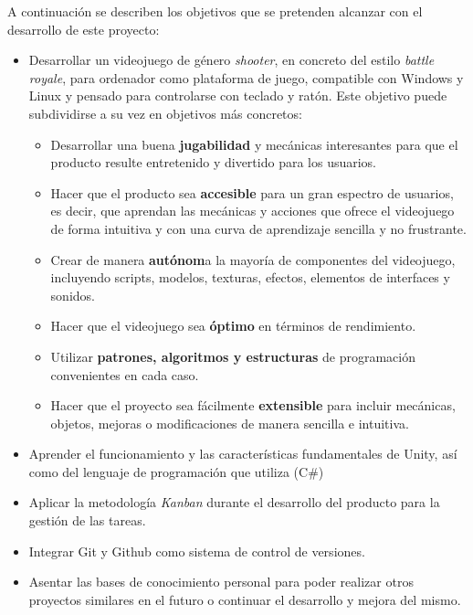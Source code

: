 
A continuación se describen los objetivos que se pretenden alcanzar con el desarrollo de este proyecto:
\begin{itemize}
\tightlist
	\item Desarrollar un videojuego de género \textit{shooter}, en concreto del estilo \textit{battle royale}, para ordenador como plataforma de juego, compatible con Windows y Linux y pensado para controlarse con teclado y ratón. Este objetivo puede subdividirse a su vez en objetivos más concretos:
    	\begin{itemize}
    	\tightlist
    	\item Desarrollar una buena \textbf{jugabilidad} y mecánicas interesantes para que el producto resulte entretenido y divertido para los usuarios.
    	\item Hacer que el producto sea \textbf{accesible} para un gran espectro de usuarios, es decir, que aprendan las mecánicas y acciones que ofrece el videojuego de forma intuitiva y con una curva de aprendizaje sencilla y no frustrante.
    	\item Crear de manera \textbf{autónom}a la mayoría de componentes del videojuego, incluyendo scripts, modelos, texturas, efectos, elementos de interfaces y sonidos.
    	\item Hacer que el videojuego sea \textbf{óptimo} en términos de rendimiento.
    	\item Utilizar \textbf{patrones, algoritmos y estructuras} de programación convenientes en cada caso.
    	\item Hacer que el proyecto sea fácilmente \textbf{extensible} para incluir mecánicas, objetos, mejoras o modificaciones de manera sencilla e intuitiva.
    	\end{itemize}
	\item Aprender el funcionamiento y las características fundamentales de Unity, así como del lenguaje de programación que utiliza (C\#)
	\item Aplicar la metodología \textit{Kanban} durante el desarrollo del producto para la gestión de las tareas.
	\item Integrar Git y Github como sistema de control de versiones.
	\item Asentar las bases de conocimiento personal para poder realizar otros proyectos similares en el futuro o continuar el desarrollo y mejora del mismo.
\end{itemize}